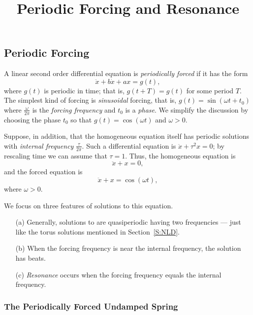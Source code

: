 \documentclass{ximera}
\title{Periodic Forcing and Resonance}
\begin{document}
\begin{abstract}
\end{abstract}
\maketitle


\label{S:resonance}

\subsection*{Periodic Forcing}

A linear second order differential equation is {\em periodically forced\/} 
 if it has the form
\[
\ddot{x} + b\dot{x} + ax = g(t),
\]
where $g(t)$ is periodic in time; that is, $g(t+T) = g(t)$ for some
period $T$.  The simplest kind of forcing is {\em sinusoidal\/} forcing,
that is, $g(t)=\sin(\omega t+ t_0)$ where $\frac{\omega}{2\pi}$ is the 
{\em forcing frequency\/} and $t_0$ is a 
{\em phase\/}.  We simplify 
the discussion by choosing the phase $t_0$ so that $g(t)=\cos(\omega t)$ 
and $\omega>0$.

Suppose, in addition, that the homogeneous equation itself has periodic 
solutions with 
{\em internal frequency\/} 
$\frac{\tau}{2\pi}$.  Such a 
differential equation is $\ddot{x}+\tau^2x=0$; by rescaling time we 
can assume that $\tau=1$.   Thus, the homogeneous equation is 
\[
\ddot x + x = 0,
\]
and the forced equation is
\begin{equation} \label{eq:uspf}
\ddot x + x = \cos(\omega t),
\end{equation}
where $\omega>0$.

We focus on three features of solutions to this equation.
\begin{itemize}
\item[(a)]	Generally, solutions to  are quasiperiodic 
having two frequencies --- just like the torus 
solutions mentioned in Section~\ref{S:NLD}.
\item[(b)]	When the forcing frequency is near the internal frequency, the
solution has beats.
\item[(c)] 	{\em Resonance\/} occurs when the 
forcing frequency equals the internal frequency.  
\end{itemize}

\subsubsection*{The Periodically Forced Undamped Spring}
\end{document}
